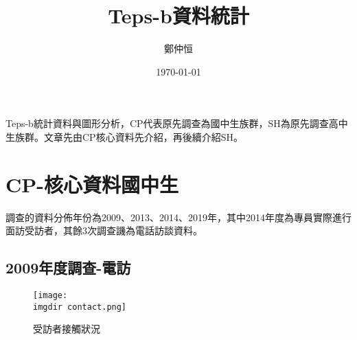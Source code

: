 \documentclass[12pt, a4paper]{article}
\title{ Teps-b資料統計}
\author{{\SM 鄭仲恒}}
\date{{\TT \today}}
\begin{document}
\maketitle
\fontsize{12}{22 pt}\selectfont
Teps-b統計資料與圖形分析，CP代表原先調查為國中生族群，SH為原先調查高中生族群。文章先由CP核心資料先介紹，再後續介紹SH。



\section{CP-核心資料國中生}
調查的資料分佈年份為2009、2013、2014、2019年，其中2014年度為專員實際進行面訪受訪者，其餘3次調查譏為電話訪談資料。
\subsection{2009年度調查-電訪}
\begin{figure}[H]
    \centering
    \texttt{[image: \\imgdir contact.png]}
    \caption{受訪者接觸狀況}\label{pic:contact}

\end{figure}
\end{document}
